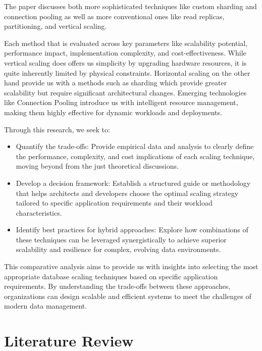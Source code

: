 \documentclass[conference]{IEEEtran}
\begin{document}
The paper discusses both more sophisticated techniques like custom sharding and connection pooling as well as more conventional ones like read replicas, partitioning, and vertical scaling\cite{b2}\cite{b2}.\cite{b13}

Each method that is evaluated across key parameters like scalability potential, performance impact, implementation complexity, and cost-effectiveness. While vertical scaling does offers us simplicity by upgrading hardware resources, it is quite inherently limited by physical constraints. Horizontal scaling on the other hand provide us with a methods such as sharding which provide greater scalability but require significant architectural changes. Emerging technologies like Connection Pooling introduce us with intelligent resource management, making them highly effective for dynamic workloads and deployments. 

Through this research, we seek to:
\begin{itemize}
\item Quantify the trade-offs: Provide empirical data and analysis to clearly define the performance, complexity, and cost implications of each scaling technique, moving beyond from the just theoretical discussions.
\item Develop a decision framework: Establish a structured guide or methodology that helps architects and developers choose the optimal scaling strategy tailored to specific application requirements and their workload characteristics.
\item Identify best practices for hybrid approaches: Explore how combinations of these techniques can be leveraged synergistically to achieve superior scalability and resilience for complex, evolving data environments.
\end{itemize}

This comparative analysis aims to provide us with insights into selecting the most appropriate database scaling techniques based on specific application requirements. By understanding the trade-offs between these approaches, organizations can design scalable and efficient systems to meet the challenges of modern data management.

\section{Literature Review}
\end{document}
